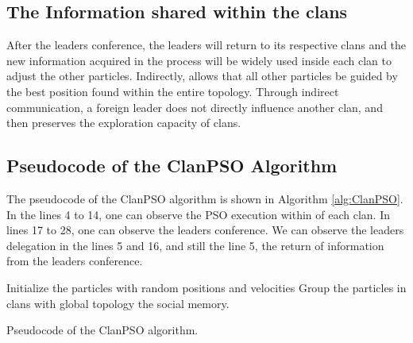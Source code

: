 \subsection{The Information shared within the clans}
After the leaders conference, the leaders will return to its respective clans and the new information acquired in the process will be widely used inside each clan to adjust the other particles. Indirectly, allows that all other particles be guided by the best position found within the entire topology. Through indirect communication, a foreign leader does not directly influence another clan, and then preserves the  exploration capacity of clans.

\subsection{Pseudocode of the ClanPSO Algorithm}
The pseudocode of the ClanPSO algorithm is shown in Algorithm \ref{alg:ClanPSO}. In the lines 4 to 14, one can observe the PSO execution within of each clan. In lines 17 to 28, one can observe the leaders conference. We can observe the leaders delegation in the lines 5 and 16, and still the line 5, the return of information from the leaders conference.

\begin{algorithm}[!h]
    Initialize the particles with random positions and velocities\;
    Group the particles in clans with global topology\;
    \Return the social memory.
    \caption{Pseudocode of the ClanPSO algorithm.}
    \label{alg:ClanPSO}
\end{algorithm}


